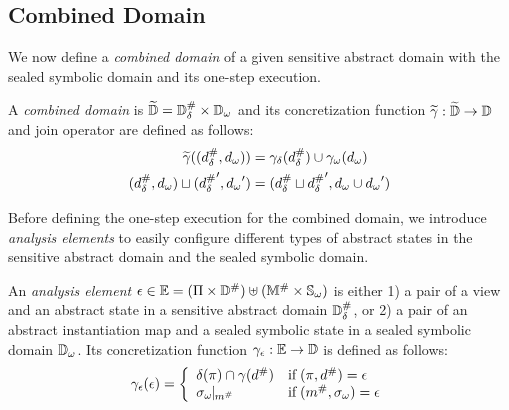 \subsection{Combined Domain}
We now define a \textit{combined domain} of a given sensitive abstract
domain with the sealed symbolic domain and its one-step execution.
\begin{definition}
  A \textit{combined domain} is $\widetilde{\mathbb{D}} = {\mathbb{D}}^{\#}_\delta \times {\mathbb{D}}_\omega$ and its
  concretization function $\widetilde{\gamma}: \widetilde{\mathbb{D}} \rightarrow \mathbb{D}$ and join
  operator are defined as follows:
  \begin{align}
    \widetilde{\gamma}(({{d}^{\#}_\delta}, {{d}_\omega})) &= \gamma_\delta({{d}^{\#}_\delta}) \cup
      {\gamma}_\omega({{d}_\omega})\\
    ({{d}^{\#}_\delta}, {{d}_\omega}) \sqcup ({{{d}^{\#}_\delta}}', {{d}_\omega}') &= ({{d}^{\#}_\delta} \sqcup
      {{{d}^{\#}_\delta}}', {{d}_\omega} \cup {{d}_\omega}')
  \end{align}
\end{definition}

Before defining the one-step execution for the combined domain, we introduce
\textit{analysis elements} to easily configure different types of abstract
states in the sensitive abstract domain and the sealed symbolic domain.
\begin{definition}\label{def:aelem}
  An \textit{analysis element} $\epsilon \in \mathbb{E} = (\Pi \times {\mathbb{D}}^{\#})
  \uplus ({\mathbb{M}}^{\#} \times {\mathbb{S}}_\omega)$ is either 1) a pair of a view and an
  abstract state in a sensitive abstract domain ${\mathbb{D}}^{\#}_\delta$, or 2) a pair of an
  abstract instantiation map and a sealed symbolic state in a sealed symbolic
  domain ${\mathbb{D}}_\omega$.  Its concretization function $\gamma_{\epsilon}:
  \mathbb{E} \rightarrow \mathbb{D}$ is defined as follows:
  \[
    \gamma_{\epsilon}(\epsilon) = \left\{
      \begin{array}{ll}
        \delta(\pi) \cap \gamma({d}^{\#}) & \text{if} \; (\pi, {d}^{\#}) = \epsilon\\
        {\sigma}_\omega\!\!\mid\!\!_{{m}^{\#}} & \text{if} \; ({m}^{\#}, {\sigma}_\omega) = \epsilon\\
      \end{array}
    \right.
  \]
\end{definition}

